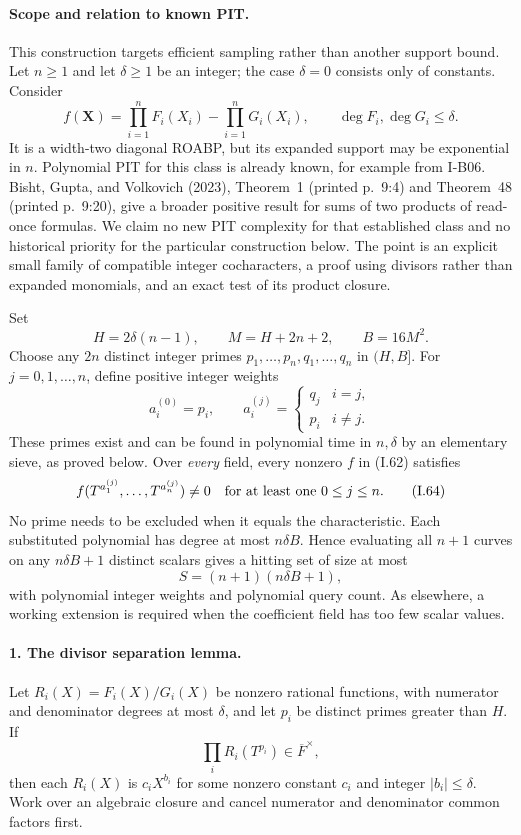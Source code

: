 \documentclass[11pt,a4paper]{article}
\theoremstyle{definition}\newtheorem{definition}{Definition}
\begin{document}
\paragraph{Scope and relation to known PIT.}
This construction targets efficient sampling rather than another
support bound.  Let $n\ge1$ and let $\delta\ge1$ be an integer;
the case $\delta=0$ consists only of constants.  Consider
\[
 f(\mathbf X)=\prod_{i=1}^n F_i(X_i)-\prod_{i=1}^n G_i(X_i),
 \qquad \deg F_i,\deg G_i\le\delta.
 \tag{I.62}
\]
It is a width-two diagonal ROABP, but its expanded support
may be exponential in $n$.  Polynomial PIT for this class
is already known, for example from I-B06.  Bisht, Gupta,
and Volkovich (2023), Theorem~1 (printed p.~9:4) and
Theorem~48 (printed p.~9:20), give a broader positive result
for sums of two products of read-once formulas.  We claim
no new PIT complexity for that established class and no
historical priority for the particular construction below.
The point is an explicit small family of compatible
integer cocharacters, a proof using divisors rather than
expanded monomials, and an exact test of its product closure.

Set
\[
 H=2\delta(n-1),\qquad M=H+2n+2,\qquad B=16M^2.
\]
Choose any $2n$ distinct integer primes
$p_1,\ldots,p_n,q_1,\ldots,q_n$ in $(H,B]$.
For $j=0,1,\ldots,n$, define positive integer weights
\[
 a_i^{(0)}=p_i,\qquad
 a_i^{(j)}=\begin{cases}q_j&i=j,\\p_i&i\ne j.\end{cases}
 \tag{I.63}
\]
These primes exist and can be found in polynomial time in
$n,\delta$ by an elementary sieve, as proved below.
Over \emph{every} field, every nonzero $f$ in (I.62) satisfies
\[
 f(T^{a_1^{(j)}},\ldots,T^{a_n^{(j)}})\ne0
 \quad\hbox{for at least one }0\le j\le n.
 \tag{I.64}
\]
No prime needs to be excluded when it equals the characteristic.
Each substituted polynomial has degree at most $n\delta B$.
Hence evaluating all $n+1$ curves on any $n\delta B+1$
distinct scalars gives a hitting set of size at most
\[
 S=(n+1)(n\delta B+1),
 \tag{I.65}
\]
with polynomial integer weights and polynomial query count.
As elsewhere, a working extension is required when the
coefficient field has too few scalar values.

\paragraph{1. The divisor separation lemma.}
Let $R_i(X)=F_i(X)/G_i(X)$ be nonzero rational functions,
with numerator and denominator degrees at most $\delta$,
and let $p_i$ be distinct primes greater than $H$.
If
\[
 \prod_i R_i(T^{p_i})\in\overline F^{\times},
 \tag{I.66}
\]
then each $R_i(X)$ is $c_iX^{b_i}$ for some nonzero
constant $c_i$ and integer $|b_i|\le\delta$.
Work over an algebraic closure and cancel numerator and
denominator common factors first.
\end{document}
